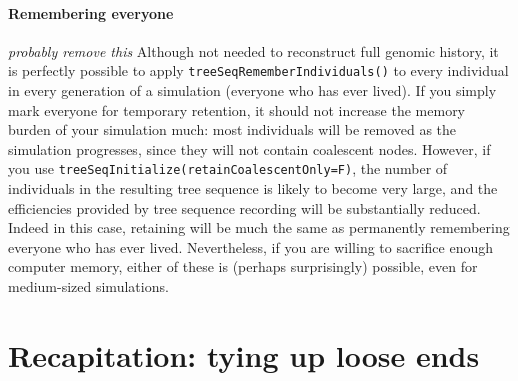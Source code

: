 \documentclass[12pt]{article}
\newcommand{\comment}[1]{\textit{\color{green} #1}}
\begin{document}
\paragraph{Remembering everyone}
\comment{probably remove this}
Although not needed to reconstruct full genomic history,
it is perfectly possible to apply \verb|treeSeqRememberIndividuals()| to every individual
in every generation of a simulation (everyone who has ever lived).
If you simply mark everyone for temporary retention,
it should not increase the memory burden of your simulation much:
most individuals will be removed as the simulation progresses,
since they will not contain coalescent nodes.
However, if you use \verb|treeSeqInitialize(retainCoalescentOnly=F)|,
the number of individuals in the resulting tree sequence is likely to become very large,
and the efficiencies provided by tree sequence recording will be substantially reduced.
Indeed in this case,
retaining will be much the same as permanently remembering everyone who has ever lived.
Nevertheless, if you are willing to sacrifice enough computer memory,
either of these is (perhaps surprisingly) possible, even for medium-sized simulations.


\section{Recapitation: tying up loose ends}
\end{document}
